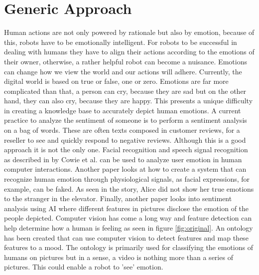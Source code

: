 \documentclass{lncs}
\begin{document}
\section{Generic Approach}

Human actions are not only powered by rationale but also by emotion, because of this, robots have to be emotionally intelligent. For robots to be successful in dealing with humans they have to align their actions according to the emotions of their owner, otherwise, a rather helpful robot can become a nuisance. Emotions can change how we view the world and our actions will adhere.
Currently, the digital world is based on true or false, one or zero. Emotions are far more complicated than that, a person can cry, because they are sad but on the other hand, they can also cry, because they are happy. This presents a unique difficulty in creating a knowledge base to accurately depict human emotions. A current practice to analyze the sentiment of someone is to perform a sentiment analysis on a bag of words. These are often texts composed in customer reviews, for a reseller to see and quickly respond to negative reviews. Although this is a good approach it is not the only one. Facial recognition and speech signal recognition as described in \cite{cowie2001emotion} by Cowie et al. can be used to analyze user emotion in human computer interactions. Another paper \cite{kim2004emotion} looks at how to create a system that can recognize human emotion through physiological signals, as facial expressions, for example, can be faked. As seen in the story, Alice did not show her true emotions to the stranger in the elevator. Finally, another paper \cite{borth2013large} looks into sentiment analysis using AI where different features in pictures disclose the emotion of the people depicted. Computer vision has come a long way and feature detection can help determine how a human is feeling as seen in figure \ref{fig:original}. An ontology has been \cite{borth2013large} created that can use computer vision to detect features and map these features to a mood. The ontology is primarily used for classifying the emotions of humans on pictures but in a sense, a video is nothing more than a series of pictures. This could enable a robot to 'see' emotion.
\end{document}
